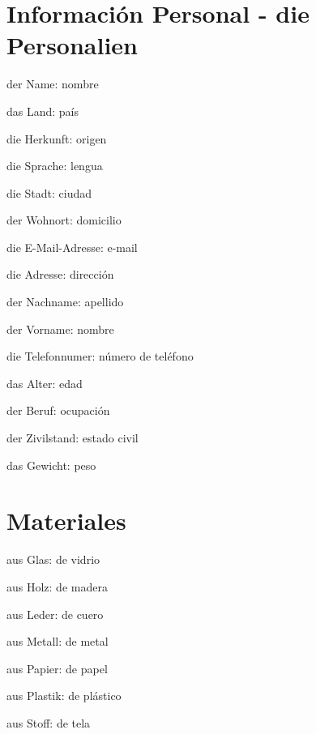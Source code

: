 \section{Información Personal - die Personalien}
\begin{multicols}{2}
\begin{myitemize}
\item der Name: nombre
\item das Land: país
\item die Herkunft: origen
\item die Sprache: lengua
\item die Stadt: ciudad
\item der Wohnort: domicilio
\item die E-Mail-Adresse: e-mail
\item die Adresse: dirección
\item der Nachname: apellido
\item der Vorname: nombre
\item die Telefonnumer: número de teléfono
\item das Alter: edad
\item der Beruf: ocupación
\item der Zivilstand: estado civil
\item das Gewicht: peso
\end{myitemize}
\end{multicols}

\section{Materiales}
\begin{multicols}{3}
\begin{myitemize}
\item aus Glas: de vidrio
\item aus Holz: de madera
\item aus Leder: de cuero
\item aus Metall: de metal
\item aus Papier: de papel
\item aus Plastik: de plástico
\item aus Stoff: de tela
\end{myitemize}
\end{multicols}


